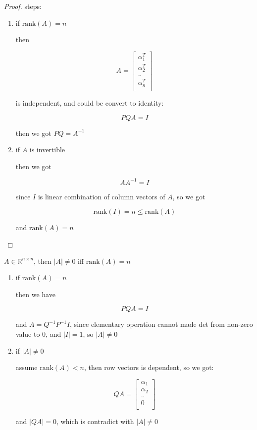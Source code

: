 \begin{proof}
    steps:
    
    \begin{enumerate}
        \item if $\mathrm{rank}(A) = n$ 

        then 

        \[
            A = \begin{bmatrix}
                \alpha_1^T \\
                \alpha_2^T \\
                .. \\
                \alpha_n^T \\
            \end{bmatrix}
        \]

        is independent, and could be convert to identity:

        \[
            PQ A = I
        \]

        then we got $PQ = A^{-1}$

        \item if $A$ is invertible


        then we got 

        \[
            AA^{-1} = I
        \]

        since $I$ is linear combination of column vectors of $A$, so we got

        \[
            \mathrm{rank}(I) = n \le \mathrm{rank}(A)
        \]

        and $\mathrm{rank}(A) = n$
    \end{enumerate}
\end{proof}

\begin{exercise}
    $A \in \mathbb{R}^{n \times n}$, then $|A| \ne 0$ iff $\mathrm{rank}(A) = n$

    \begin{enumerate}
        \item if $\mathrm{rank}(A) = n$

        then we have

        \[
            PQA = I 
        \]

        and $A = Q^{-1}P^{-1}I$, since elementary operation cannot made det from non-zero value to $0$,
        and $|I| = 1$, so $|A| \ne 0$

        \item if $|A| \ne 0$

        assume $\mathrm{rank}(A) < n$, then row vectors is dependent, so we got:

        \[
         QA = \begin{bmatrix}
            \alpha_1 \\
            \alpha_2 \\
            .. \\
            0 \\
         \end{bmatrix}
        \]

        and $|QA| = 0$, which is contradict with $|A| \ne 0$
    \end{enumerate}
\end{exercise}

